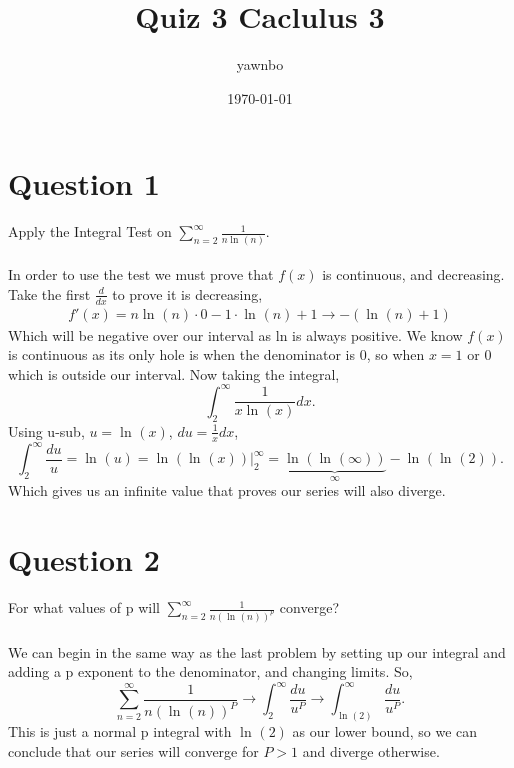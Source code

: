 \documentclass[a4paper]{article}
\title{Quiz 3 Caclulus 3}
\author{yawnbo}
\date{\today}
\begin{document}
\maketitle
\section*{Question 1}%
\label{sec:Question 1}
Apply the Integral Test on $ \sum_{ n=2 } ^{ \infty } \frac{ 1 }{ n\ln^{  } \left( n \right)  }  $. \\ \\
In order to use the test we must prove that $ f\left( x \right)  $ is continuous, and decreasing. Take the first $ \frac{ d }{ dx }  $ to prove it is decreasing, 
\begin{gather*}
f'\left( x \right) =  n\ln^{  } \left( n \right) \cdot 0 - 1 \cdot \ln^{  } \left( n \right) +1 \to -\left( \ln^{  } \left( n \right) +1 \right) 
\end{gather*}
Which will be negative over our interval as ln is always positive. We know $ f\left( x \right)  $ is continuous as its only hole is when the denominator is 0, so when $ x=1 \text{ or } 0  $ which is outside our interval. Now taking the integral,
\[
\int_{ 2 }^{ \infty } \frac{ 1 }{ x\ln^{  } \left( x \right)  } dx
.\] 
Using u-sub, $ u = \ln^{  } \left( x \right)  $, $ du = \frac{ 1 }{ x } dx $,
\[
	\int_{ 2 }^{ \infty } \frac{ du }{ u } = \ln^{  } \left( u \right) = \ln^{  } \left( \ln^{  } \left( x \right)  \right) \bigg|_{ 2 }^{ \infty } = \underbrace{\ln^{  } \left( \ln^{  } \left( \infty \right)  \right) }_{\infty} - \ln^{  } \left( \ln^{  } \left( 2 \right)  \right) 
.\] 
Which gives us an infinite value that proves our series will also diverge. 

\section*{Question 2}%
\label{sec:Question 2}
For what values of p will $ \sum_{ n=2 } ^{ \infty } \frac{ 1 }{ n\left( \ln^{  } \left( n \right)  \right) ^{ p } }  $ converge? \\ \\

We can begin in the same way as the last problem by setting up our integral and adding a p exponent to the denominator, and changing limits. So,
\[
\sum_{ n=2 } ^{ \infty } \frac{ 1 }{ n\left( \ln^{  } \left( n \right)  \right) ^{ P } } \to \int_{ 2 }^{ \infty } \frac{ du }{ u^{ P } } \to \int_{ \ln^{  } \left( 2 \right)  }^{ \infty } \frac{ du }{ u^{ P } } 
.\] 
This is just a normal p integral with $ \ln^{  } \left( 2 \right)  $ as our lower bound, so we can conclude that our series will converge for $ P>1 $ and diverge otherwise. 
\end{document}
